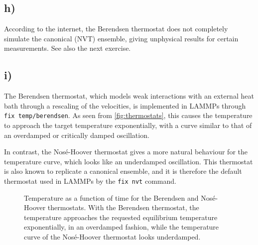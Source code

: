 \documentclass[11pt,british,a4paper]{report}
\begin{document}
\subsection*{h)}
According to the internet\cite{lemak_berendsen_1994}, the Berendsen thermostat does not completely simulate the canonical (NVT) ensemble, giving unphysical results for certain measurements. See also the next exercise.

\subsection*{i)}
The Berendsen thermostat, which models weak interactions with an external heat bath through a rescaling of the velocities, is implemented in LAMMPs through \texttt{fix temp/berendsen}.
As seen from \vref{fig:thermostats}, this causes the temperature to approach the target temperature exponentially, with a curve similar to that of an overdamped or critically damped oscillation.

In contrast, the Nosé-Hoover thermostat gives a more natural behaviour for the temperature curve, which looks like an underdamped oscillation.
This thermostat is also known to replicate a canonical ensemble\cite{evans_nosehoover_1985}, and it is therefore the default thermostat used in LAMMPs by the \texttt{fix nvt} command.
\begin{figure}[htbp]
    \centering
    \caption{Temperature as a function of time for the Berendsen and Nosé-Hoover thermostats.
    With the Berendsen thermostat, the temperature approaches the requested equilibrium temperature exponentially, in an overdamped fashion, while the temperature curve of the Nosé-Hoover thermostat looks underdamped.}%
    \label{fig:thermostats}
\end{figure}
\end{document}
